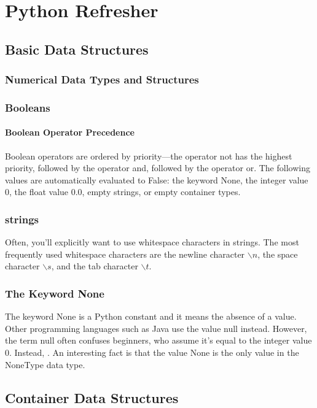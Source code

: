 \chapter{Python Refresher\label{Ch01}}
\section{Basic Data Structures}
\subsection{Numerical Data Types and Structures}
\subsection{Booleans}
\subsubsection*{Boolean Operator Precedence}
Boolean operators are ordered by priority—the operator not has the highest priority, followed by the operator and, followed by the operator or. The following values are automatically evaluated to False: the keyword None, the integer value 0, the float value 0.0, empty strings, or empty container types.

\subsection{strings}
Often, you'll explicitly want to use whitespace characters in strings. The most frequently used whitespace characters are the newline character $\backslash n$, the space character $\backslash s$, and the tab character $\backslash t$.
\subsection{The Keyword \textsf{None}}
The keyword \textsf{None} is a Python constant and it means the absence of a value. Other programming languages such as Java use the value \textsf{null} instead. However, the term null often confuses beginners, who assume it's equal to the integer value 0. Instead, . An interesting fact is that the value None is the only value in the NoneType data type.
\section{Container Data Structures}
